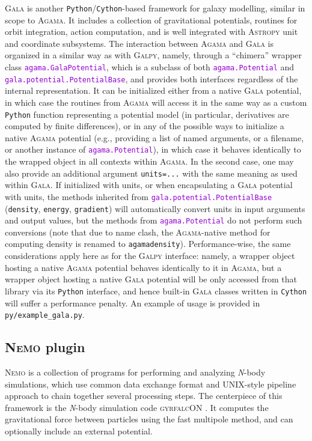 \documentclass[12pt]{article}
\newcommand{\Agama}{\textsc{Agama}\xspace}
\newcommand{\Galpy}{\textsc{Galpy}\xspace}
\newcommand{\Gala} {\textsc{Gala}\xspace}
\newcommand{\Nemo} {\textsc{Nemo}\xspace}
\newcommand{\Nbody}{\textsl{N}-body\xspace}
\newcommand{\Python}{\texttt{Python}\xspace}
\newcommand{\ttt}[1]{\textcolor{darkviolet}{\texttt{#1}}}
\begin{document}
\Gala \cite{Gala} is another \Python/\texttt{Cython}-based framework for galaxy modelling, similar in scope to \Agama. It includes a collection of gravitational potentials, routines for orbit integration, action computation, and is well integrated with \textsc{Astropy} unit and coordinate subsystems.
The interaction between \Agama and \Gala is organized in a similar way as with \Galpy, namely, through a ``chimera'' wrapper class \ttt{agama.GalaPotential}, which is a subclass of both \ttt{agama.Potential} and \ttt{gala.potential.PotentialBase}, and provides both interfaces regardless of the internal representation. It can be initialized either from a native \Gala potential, in which case the routines from \Agama will access it in the same way as a custom \Python function representing a potential model (in particular, derivatives are computed by finite differences), or in any of the possible ways to initialize a native \Agama potential (e.g., providing a list of named arguments, or a filename, or another instance of \ttt{agama.Potential}), in which case it behaves identically to the wrapped object in all contexts within \Agama. In the second case, one may also provide an additional argument \texttt{units=...} with the same meaning as used within \Gala. If initialized with units, or when encapsulating a \Gala potential with units, the methods inherited from \ttt{gala.potential.PotentialBase} (\texttt{density}, \texttt{energy}, \texttt{gradient}) will automatically convert units in input arguments and output values, but the methods from \ttt{agama.Potential} do not perform such conversions (note that due to name clash, the \Agama-native method for computing density is renamed to \texttt{agamadensity}). Performance-wise, the same considerations apply here as for the \Galpy interface: namely, a wrapper object hosting a  native \Agama potential behaves identically to it in \Agama, but a wrapper object hosting a native \Gala potential will be only accessed from that library via its \Python interface, and hence built-in \Gala classes written in \texttt{Cython} will suffer a performance penalty. An example of usage is provided in \texttt{py/example_gala.py}.


\subsection{\Nemo plugin}  \label{sec:Nemo}

\Nemo \cite{Teuben1995} is a collection of programs for performing and analyzing \Nbody simulations, which use common data exchange format and UNIX-style pipeline approach to chain together several processing steps. The centerpiece of this framework is the \Nbody simulation code \textsc{gyrfalcON} \cite{Dehnen2000}. It computes the gravitational force between particles using the fast multipole method, and can optionally include an external potential.
\end{document}
